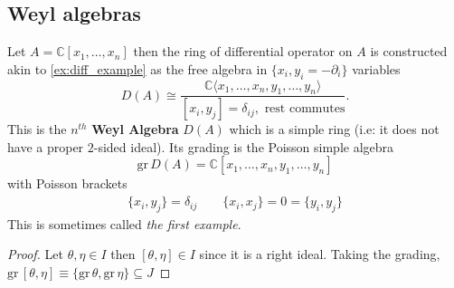 \subsection{Weyl algebras} %
\label{sub:weyl_algebras}
Let $A = \mathbb{C}[x_1, \ldots, x_n]$ then the ring of differential operator on $A$ is constructed akin to \cref{ex:diff_example} as the free algebra in $\{x_i, y_i = - \partial_i\}$ variables
\begin{equation}
    D(A) \cong \frac{\mathbb{C} \langle x_1, \ldots, x_n, y_1, \ldots, y_n\rangle}{[x_i, y_j] = \delta_{ij}, \textrm{ rest commutes}}.
\end{equation}
This is the $n^{th}$ \textbf{Weyl Algebra} $D(A)$ which is a simple ring (i.e: it does not have a proper $2$-sided ideal).
Its grading is the Poisson simple algebra
\begin{equation}
    \mathrm{gr}\, D(A) = \mathbb{C}[x_1,\ldots,x_n,y_1,\ldots,y_n]
\end{equation}
with Poisson brackets
\begin{align}
    \{x_i,y_j\} = \delta_{ij} \qquad \{x_i,x_j\}=0=\{y_i,y_j\}
\end{align}
This is sometimes called \textit{the first example}.

\label{rem:fin_dim}

\label{prop:weyl_ideals}
\begin{proof}
    Let $\theta, \eta \in I$ then $[\theta, \eta] \in I$ since it is a right ideal.
    Taking the grading, $\mathrm{gr}\, [\theta, \eta] \equiv \{\mathrm{gr}\,\theta, \mathrm{gr}\, \eta\}\subseteq J$
\end{proof}

\label{thm:Gabber}

